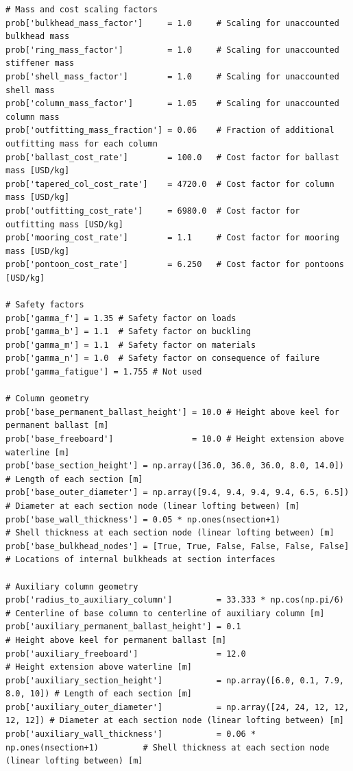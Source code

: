 \begin{lstlisting}
# Mass and cost scaling factors
prob['bulkhead_mass_factor']     = 1.0     # Scaling for unaccounted bulkhead mass
prob['ring_mass_factor']         = 1.0     # Scaling for unaccounted stiffener mass
prob['shell_mass_factor']        = 1.0     # Scaling for unaccounted shell mass
prob['column_mass_factor']       = 1.05    # Scaling for unaccounted column mass
prob['outfitting_mass_fraction'] = 0.06    # Fraction of additional outfitting mass for each column
prob['ballast_cost_rate']        = 100.0   # Cost factor for ballast mass [USD/kg]
prob['tapered_col_cost_rate']    = 4720.0  # Cost factor for column mass [USD/kg]
prob['outfitting_cost_rate']     = 6980.0  # Cost factor for outfitting mass [USD/kg]
prob['mooring_cost_rate']        = 1.1     # Cost factor for mooring mass [USD/kg]
prob['pontoon_cost_rate']        = 6.250   # Cost factor for pontoons [USD/kg]

# Safety factors
prob['gamma_f'] = 1.35 # Safety factor on loads
prob['gamma_b'] = 1.1  # Safety factor on buckling
prob['gamma_m'] = 1.1  # Safety factor on materials
prob['gamma_n'] = 1.0  # Safety factor on consequence of failure
prob['gamma_fatigue'] = 1.755 # Not used

# Column geometry
prob['base_permanent_ballast_height'] = 10.0 # Height above keel for permanent ballast [m]
prob['base_freeboard']                = 10.0 # Height extension above waterline [m]
prob['base_section_height'] = np.array([36.0, 36.0, 36.0, 8.0, 14.0])  # Length of each section [m]
prob['base_outer_diameter'] = np.array([9.4, 9.4, 9.4, 9.4, 6.5, 6.5]) # Diameter at each section node (linear lofting between) [m]
prob['base_wall_thickness'] = 0.05 * np.ones(nsection+1)               # Shell thickness at each section node (linear lofting between) [m]
prob['base_bulkhead_nodes'] = [True, True, False, False, False, False] # Locations of internal bulkheads at section interfaces

# Auxiliary column geometry
prob['radius_to_auxiliary_column']         = 33.333 * np.cos(np.pi/6) # Centerline of base column to centerline of auxiliary column [m]
prob['auxiliary_permanent_ballast_height'] = 0.1                      # Height above keel for permanent ballast [m]
prob['auxiliary_freeboard']                = 12.0                     # Height extension above waterline [m]
prob['auxiliary_section_height']           = np.array([6.0, 0.1, 7.9, 8.0, 10]) # Length of each section [m]
prob['auxiliary_outer_diameter']           = np.array([24, 24, 12, 12, 12, 12]) # Diameter at each section node (linear lofting between) [m]
prob['auxiliary_wall_thickness']           = 0.06 * np.ones(nsection+1)         # Shell thickness at each section node (linear lofting between) [m]


\end{lstlisting}
